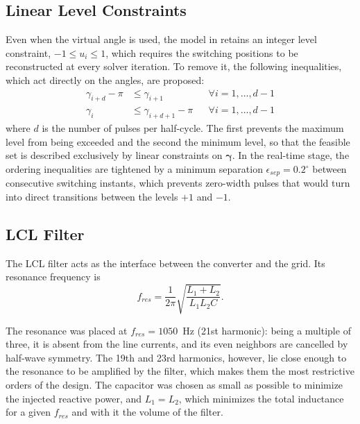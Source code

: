 \documentclass[conference]{IEEEtran}
\newcommand{\gv}{\boldsymbol{\gamma}}
\begin{document}
\subsection{Linear Level Constraints}
Even when the virtual angle is used, the model in \cite{koukoula_junction}
retains an integer level constraint, $-1 \leq u_i \leq 1$, which requires the
switching positions to be reconstructed at every solver iteration. To remove it,
the following inequalities, which act directly on the angles, are proposed:
\begin{subequations}
     \begin{align}
        \gamma_{i+d} - \pi &\leq \gamma_{i+1}
            &&\forall i = 1,\dots,d-1\\
        \gamma_{i} &\leq \gamma_{i+d+1} - \pi
            &&\forall i = 1,\dots,d-1
    \end{align}
    \label{eq:niveles}
\end{subequations}
where $d$ is the number of pulses per half-cycle. The first prevents the maximum level
from being exceeded and the second the minimum level, so that the feasible set is
described exclusively by linear constraints on $\gv$. In the real-time stage, the
ordering inequalities are tightened by a minimum separation
$\epsilon_{sep}=0.2^\circ$ between consecutive switching instants, which
prevents zero-width pulses that would turn into direct transitions between
the levels $+1$ and $-1$.

\subsection{LCL Filter}
\label{sec:filtro}

The LCL filter acts as the interface between the converter and the grid. Its
resonance frequency is
\begin{equation}
    f_{res} = \frac{1}{2\pi}\sqrt{\frac{L_1+L_2}{L_1L_2C}}.
    \label{eq:fres}
\end{equation}

The resonance was placed at $f_{res}=1050$~Hz (21st harmonic):
being a multiple of three, it is absent from the line currents, and its even
neighbors are cancelled by half-wave symmetry. The 19th and 23rd harmonics,
however, lie close enough to the resonance to be amplified by the filter,
which makes them the most restrictive orders of the design. The capacitor
was chosen as small as possible to minimize the injected reactive power,
and $L_1=L_2$, which minimizes the total inductance for a given $f_{res}$
and with it the volume of the filter.
\end{document}
